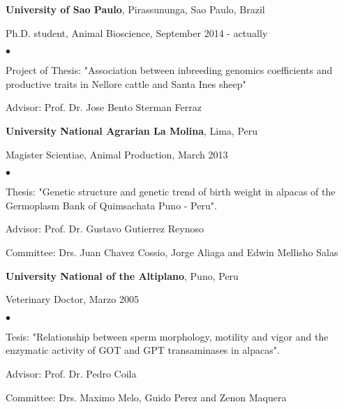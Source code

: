 \documentclass[margin,line,10pt]{res}
\newenvironment{list1}{
  \begin{list}{\ding{113}}{%
      \setlength{\itemsep}{0in}
      \setlength{\parsep}{0in} \setlength{\parskip}{0in}
      \setlength{\topsep}{0in} \setlength{\partopsep}{0in} 
      \setlength{\leftmargin}{0.17in}}}{\end{list}}
\newenvironment{list2}{
  \begin{list}{$\bullet$}{%
      \setlength{\itemsep}{0in}
      \setlength{\parsep}{0in} \setlength{\parskip}{0in}
      \setlength{\topsep}{0in} \setlength{\partopsep}{0in} 
      \setlength{\leftmargin}{0.2in}}}{\end{list}}
\begin{document}
\begin{resume}
{\bf University of Sao Paulo}, Pirassununga, Sao Paulo, Brazil\\
\vspace*{-.1in}
\begin{list1}
\item[] Ph.D. student, Animal Bioscience, September 2014 - actually
\begin{list2}
\vspace*{.05in}
\item Project of Thesis: "Association between inbreeding genomics coefficients and productive traits in Nellore cattle and Santa Ines sheep" 
\item Advisor: Prof. Dr. Jose Bento Sterman Ferraz 
\end{list2}
\vspace*{.05in}
\end{list1}

{\bf University National Agrarian La Molina}, Lima, Peru\\
\vspace*{-.1in}
\begin{list1}
\item[] Magister Scientiae, Animal Production, March 2013
\begin{list2}
\vspace*{.05in}
\item Thesis: "Genetic structure and genetic trend of birth weight in alpacas of the Germoplasm Bank of Quimsachata Puno - Peru". 
\item Advisor: Prof. Dr. Gustavo Gutierrez Reynoso 
\item Committee: Drs. Juan Chavez Cossio, Jorge Aliaga and Edwin Mellisho Salas
\end{list2}
\vspace*{.05in}
\end{list1}

{\bf University National of the Altiplano}, Puno, Peru\\
\vspace*{-.1in}
\begin{list1}
\item[] Veterinary Doctor,  Marzo 2005
\begin{list2}
\vspace*{.05in}
\item Tesis: "Relationship between sperm morphology, motility and vigor and the enzymatic activity of GOT and GPT transaminases in alpacas". 
\item Advisor: Prof. Dr. Pedro Coila 
\item Committee: Drs. Maximo Melo, Guido Perez and Zenon Maquera
\end{list2}
\end{list1}


\end{resume}
\end{document}
